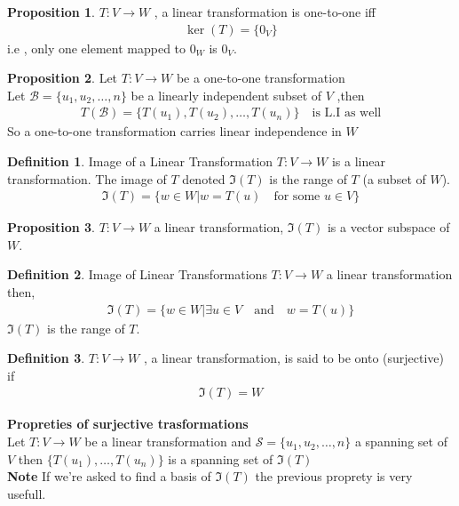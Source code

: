 \documentclass[
12pt,
]{article}
\newcommand{\tvw}{T : V\xrightarrow{} W }
\newcommand{\un}{u_1 , u_2 , \dots , n}
\theoremstyle{definition}
\theoremstyle{definition}
\theoremstyle{definition}
\newtheorem{Definition}{Definition}[section]
\theoremstyle{definition}
\newtheorem{Proposition}{Proposition}[section]
\begin{document}
\begin{Proposition}
	$\tvw$ , a linear transformation is one-to-one iff 
	\begin{gather*}
		\ker(T) = \{0_V\}
	\end{gather*}
	i.e , only one element mapped to $0_W$ is $0_V$.
\end{Proposition}
\begin{Proposition}
	Let $\tvw$ be a one-to-one transformation \\
	Let $\mathcal{B} = \{\un \}$ be a linearly independent subset of $V$ ,then \\
	\begin{gather*}
		T(\mathcal{B}) = \{ T(u_1), T(u_2), \dots, T(u_n) \} \quad \text{is L.I as well}
	\end{gather*}
	So a one-to-one transformation carries linear independence in $W$
\end{Proposition}
\begin{Definition}{Image of a Linear Transformation}
	$\tvw$ is a linear transformation. The image of $T$ denoted $\Im(T)$ is the range of $T$ (a subset of $W$). 
	\begin{gather*}
		\Im(T) = \{w\in W | w = T(u) \quad \text{for some } u \in V\}
	\end{gather*}
\end{Definition}
\begin{Proposition}
	$\tvw$ a linear transformation, $\Im(T)$ is a vector subspace of $W$.
\end{Proposition}
\begin{Definition}{Image of Linear Transformations}
	$\tvw$ a linear transformation then,
	\begin{gather*}
		\Im(T) = \{ w \in W | \exists u \in V \quad \text{and} \quad w =T(u)\}
	\end{gather*}
	$\Im(T)$ is the range of $T$.
\end{Definition}
\begin{Definition}
	$\tvw$ , a linear transformation, is said to be onto (surjective) if 
	\begin{gather*}
		\Im(T) = W
	\end{gather*}
\end{Definition}
\textbf{Propreties of surjective trasformations} \\
Let $\tvw$ be a linear transformation and $\mathcal{S} = \{\un\}$ a spanning set of $V$ then $\{T(u_1), \dots , T(u_n)\}$ is a spanning set of $\Im(T)$\\
\textbf{Note} If we're asked to find a basis of $\Im(T)$ the previous proprety is very usefull. \\
\end{document}
